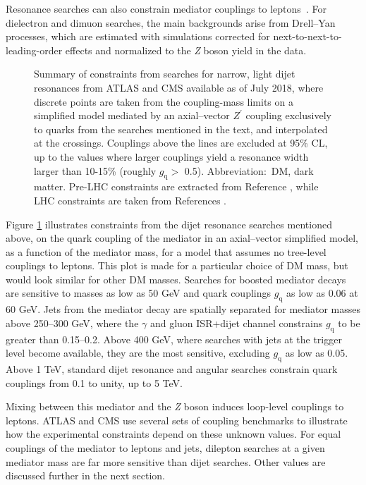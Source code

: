 \documentclass{ar-1col}
\newcommand{\gq}{$g_{\mathrm{q}}$\xspace}
\begin{document}
{Resonance searches can also constrain mediator couplings to 
leptons~\cite{Aaboud:2017buh,Khachatryan:2016zqb}. For dielectron
and dimuon searches, the main backgrounds arise from Drell--Yan
processes, which are estimated with simulations corrected for next-to-next-to-leading-order
effects and normalized to the \textit{Z} boson yield in the data.

\begin{figure}[!htpb]
\caption{Summary of constraints from searches for narrow, light dijet
resonances from ATLAS and CMS available as of
July 2018, where discrete points are taken
from the coupling-mass limits on a simplified model mediated by an
axial--vector $Z^\prime$ coupling exclusively to quarks from the
searches mentioned in the text, and interpolated at the crossings.
Couplings above the lines are excluded at 95\% CL, up to the
values where larger couplings yield a resonance width larger than
10-15\% (roughly \gq $>$ 0.5). Abbreviation:\ DM, dark matter.
Pre-LHC constraints are extracted from Reference ,
while LHC constraints are taken from References \cite{Sirunyan:2017nvi,Aaboud:2018zba,
ATLAS:2016bvn,Sirunyan:2017nvi,Sirunyan:2018xlo,Aaboud:2018fzt,Aaboud:2017yvp}.}
\label{fig:couplingmass}
\end{figure}

Figure \ref{fig:couplingmass} illustrates constraints from the
dijet resonance searches mentioned above, on the quark coupling of
the mediator in an axial--vector simplified model, as a function of
the mediator mass, for a model that assumes no tree-level
couplings to leptons. This plot is made for a particular choice of DM mass, 
but would look similar for other DM masses. 
Searches for boosted mediator decays are sensitive to masses as low as 50 GeV
and quark couplings \gq as low as 0.06 at 60 GeV. Jets from the
mediator decay are spatially separated for mediator masses above
250--300 GeV, where the $\gamma$ and gluon ISR+dijet channel
constrains \gq to be greater than 0.15--0.2. Above 400 GeV, where searches with
jets at the trigger level become available, they are the most
sensitive, excluding \gq as low as 0.05. Above 1 TeV, standard
dijet resonance and angular searches constrain quark couplings
from 0.1 to unity, up to 5 TeV.

Mixing between this mediator and the \textit{Z} boson induces loop-level
couplings to leptons. ATLAS and CMS use several sets of coupling
benchmarks to illustrate how the experimental constraints depend
on these unknown values. For equal couplings of the mediator to
leptons and jets, dilepton searches at a given mediator mass are
far more sensitive than dijet searches. Other values are
discussed further in the next section.

}
\end{document}
